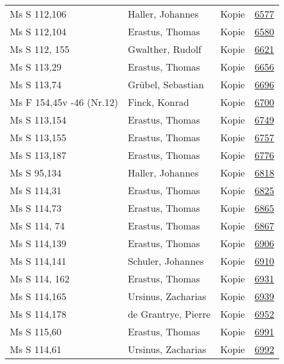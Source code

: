 \documentclass[10pt,a4paper,landscape]{report}
\begin{document}
\begin{longtable}{p{16cm}p{4cm}lr}
Ms S 112,106	&	Haller, Johannes	&	Kopie	&	\href{http://130.60.24.72/assignment/6577}{6577}\\
Ms S 112,104	&	Erastus, Thomas	&	Kopie	&	\href{http://130.60.24.72/assignment/6580}{6580}\\
Ms S 112, 155	&	Gwalther, Rudolf	&	Kopie	&	\href{http://130.60.24.72/assignment/6621}{6621}\\
Ms S 113,29	&	Erastus, Thomas	&	Kopie	&	\href{http://130.60.24.72/assignment/6656}{6656}\\
Ms S 113,74	&	Grübel, Sebastian	&	Kopie	&	\href{http://130.60.24.72/assignment/6696}{6696}\\
Ms F 154,45v -46 (Nr.12)	&	Finck, Konrad	&	Kopie	&	\href{http://130.60.24.72/assignment/6700}{6700}\\
Ms S 113,154	&	Erastus, Thomas	&	Kopie	&	\href{http://130.60.24.72/assignment/6749}{6749}\\
Ms S 113,155	&	Erastus, Thomas	&	Kopie	&	\href{http://130.60.24.72/assignment/6757}{6757}\\
Ms S 113,187	&	Erastus, Thomas	&	Kopie	&	\href{http://130.60.24.72/assignment/6776}{6776}\\
Ms S 95,134	&	Haller, Johannes	&	Kopie	&	\href{http://130.60.24.72/assignment/6818}{6818}\\
Ms S 114,31	&	Erastus, Thomas	&	Kopie	&	\href{http://130.60.24.72/assignment/6825}{6825}\\
Ms S 114,73	&	Erastus, Thomas	&	Kopie	&	\href{http://130.60.24.72/assignment/6865}{6865}\\
Ms S 114, 74	&	Erastus, Thomas	&	Kopie	&	\href{http://130.60.24.72/assignment/6867}{6867}\\
Ms S 114,139	&	Erastus, Thomas	&	Kopie	&	\href{http://130.60.24.72/assignment/6906}{6906}\\
Ms S 114,141	&	Schuler, Johannes	&	Kopie	&	\href{http://130.60.24.72/assignment/6910}{6910}\\
Ms S 114, 162	&	Erastus, Thomas	&	Kopie	&	\href{http://130.60.24.72/assignment/6931}{6931}\\
Ms S 114,165	&	Ursinus, Zacharias	&	Kopie	&	\href{http://130.60.24.72/assignment/6939}{6939}\\
Ms S 114,178	&	de Grantrye, Pierre	&	Kopie	&	\href{http://130.60.24.72/assignment/6952}{6952}\\
Ms S 115,60	&	Erastus, Thomas	&	Kopie	&	\href{http://130.60.24.72/assignment/6991}{6991}\\
Ms S 114,61	&	Ursinus, Zacharias	&	Kopie	&	\href{http://130.60.24.72/assignment/6992}{6992}\\

\end{longtable}
\end{document}
